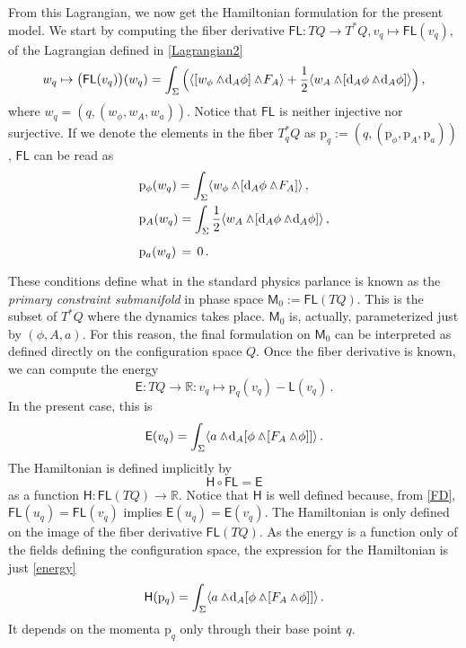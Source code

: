 \documentclass[12pt]{amsart}
\theoremstyle{plain}
\theoremstyle{definition}
\theoremstyle{remark}
\newcommand{\wed}{\wedge\hspace*{-7.5pt}.\hspace*{3pt}}
\numberwithin{equation}{section}  %
\begin{document}
From this Lagrangian, we now get the Hamiltonian formulation for the present model. We start by computing the fiber derivative $\mathsf{FL}:TQ\rightarrow T^*Q, v_q\mapsto\mathsf{FL}(v_q)$,  of the Lagrangian defined in \eqref{Lagrangian2}
\begin{equation}
 w_q\mapsto 
\big(\mathsf{FL}(v_q)\big)(w_q)=\int_\Sigma\Big(\langle[w_\phi\wed \mathrm{d}_A\phi]\wed F_A\rangle+\frac{1}{2}\langle w_A\wed[\mathrm{d}_A\phi\wed \mathrm{d}_A\phi]\rangle\Big)\,,   \label{FD}
\end{equation}
where $w_q=(q,(w_\phi,w_A,w_a))$. Notice that \(\mathsf{FL}\) is neither injective nor surjective. If we denote the elements in the fiber $T_q^*\!Q$ as $\mathrm{p}_q:=(q,(\mathrm{p}_\phi,\mathrm{p}_A,\mathrm{p}_{a}))$,  \(\mathsf{FL}\) can be read as
\begin{align}
&\mathrm{p}_\phi(w_q)=\int_\Sigma\langle w_\phi\wed [\mathrm{d}_A\phi\wed F_A]\rangle\,, \nonumber\\
&\mathrm{p}_A(w_q)=\int_\Sigma\frac{1}{2}\langle w_A\wed[\mathrm{d}_A\phi\wed \mathrm{d}_A\phi]\rangle\,, \label{momenta}\\
&\mathrm{p}_{a}(w_q)\,=\,0\,.\phantom{\frac{1}{2}} \nonumber
\end{align}
These conditions define what in the standard physics parlance is known as the \textit{primary constraint submanifold} in phase space $\mathsf{M}_0:=\mathsf{FL}(TQ)$. This is the subset of $T^*Q$ where the dynamics takes place.  $\mathsf{M}_0$ is, actually, parameterized just by $(\phi,A,a)$. For this reason, the final formulation on $\mathsf{M}_0$ can be interpreted as defined directly on the configuration space $Q$. Once the fiber derivative is known, we can compute the energy 
\[
\mathsf{E}:TQ\rightarrow\mathbb{R}:v_q\mapsto \mathrm{p}_q(v_q)-\mathsf{L}(v_q)\,.
\]
In the present case, this is
\begin{equation}\label{energy}
\mathsf{E}(v_q)=\int_\Sigma \langle a\wed \mathrm{d}_A[\phi\wed[F_A\wed\phi]]\rangle \,.
\end{equation}
The Hamiltonian is defined implicitly by 
\[
\mathsf{H}\circ \mathsf{FL}=\mathsf{E}
\]
as a function \(\mathsf{H}:\mathsf{FL}(TQ)\rightarrow \mathbb{R}\).  
Notice that $\mathsf{H}$ is well defined because, from \eqref{FD},  \(\mathsf{FL}(u_q)=\mathsf{FL}(v_q)\) implies  \(\mathsf{E}(u_q)=\mathsf{E}(v_q)\).   The Hamiltonian is only defined on the image of the fiber derivative $\mathsf{FL}(TQ)$. As the energy is a function only of the fields defining the configuration space, the expression for the Hamiltonian is just \eqref{energy}
\begin{equation}\label{H}
 \mathsf{H}(\mathrm{p}_q)=\int_\Sigma \langle a\wed \mathrm{d}_A[\phi\wed[F_A\wed\phi]]\rangle\,.
\end{equation}
It depends on the momenta $\mathrm{p}_q$ only through their base point $q$.
\end{document}
